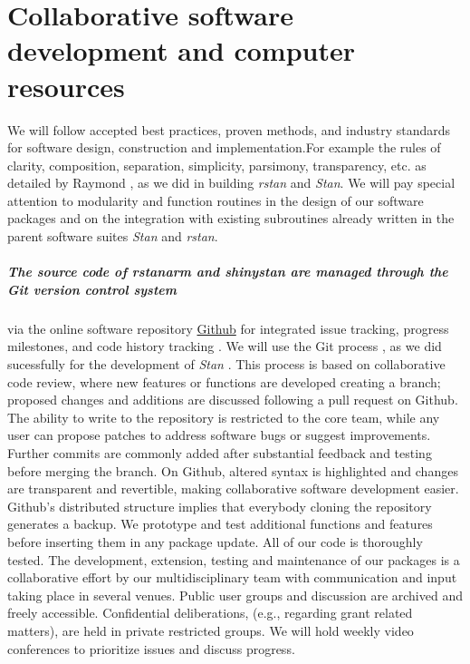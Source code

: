 \documentclass[11pt,notitlepage]{article}
\begin{document}
\section*{Collaborative software development and computer resources}
We will follow accepted best practices, proven methods, and industry standards for software design, construction and implementation.For example the rules of clarity, composition, separation, simplicity, parsimony, transparency, etc. as detailed by 
Raymond \cite{Raymond2003art}, as we did in building \textit{rstan} and \textit{Stan}. We will pay special attention to modularity 
and function routines in the design of our software packages and on the integration with existing subroutines already written in the 
parent software suites \textit{Stan} and \textit{rstan}. 

\subparagraph*{The source code of \textit{rstanarm} and \textit{shinystan} are managed through the Git version control system}
\cite{Chacon2009ProGit} via the online software repository \href{https://github.com/}{Github} for integrated issue tracking, 
progress milestones, and code history tracking \cite{loeliger2012version}. We will use the Git process \cite{Driessen2010successful}, 
as we did sucessfully for the development of \textit{Stan} \cite{Stan-manual:2015}. This  process is based on collaborative code review, 
where new features or functions are developed creating a branch; proposed changes and additions are discussed following a pull request on 
Github. The ability to write to the repository is restricted to the core team, while any user can propose patches to address software 
bugs or suggest improvements. Further commits are commonly added after substantial feedback and testing before merging the branch.  
On Github, altered syntax is highlighted and changes are transparent and revertible, making collaborative software development easier. 
Github's distributed structure implies that everybody cloning the repository generates a backup. We prototype and test additional 
functions and features before inserting them in any package update. All of our code is thoroughly tested.
The development, extension, testing and maintenance of our packages is a collaborative effort by our multidisciplinary team with 
communication and input taking place in several venues. Public user groups and discussion are archived and freely accessible. 
Confidential deliberations, (e.g., regarding grant related matters), are held in private restricted groups. We will hold weekly video 
conferences to prioritize issues and discuss progress.
\end{document}
